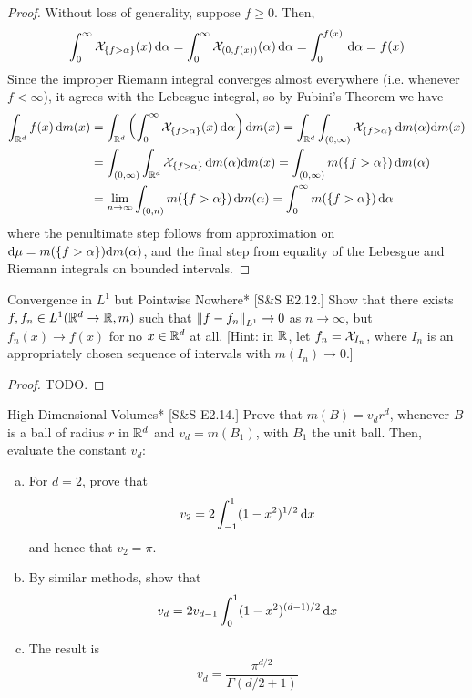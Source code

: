 \begin{proof}
    Without loss of generality, suppose \(f \geq 0\). Then, 
    \[
        \int_0^\infty \mathcal{X}_{\{f > \alpha\}}(x) \, \mathrm{d}\alpha
        = \int_0^\infty \mathcal{X}_{(0, f(x))}(\alpha) \, \mathrm{d}\alpha
        = \int_0^{f(x)} \, \mathrm{d}\alpha
        = f(x) 
    \]
    Since the improper Riemann integral converges almost everywhere (i.e. whenever \(f < \infty\)), it agrees with the Lebesgue integral, so by Fubini's Theorem we have 
    \begin{align*}
        \int_{\mathbb{R}^d} f(x) \, \mathrm{d}m(x)
        &= \int_{\mathbb{R}^d} \left(\int_0^\infty \mathcal{X}_{\{f > \alpha\}}(x) \, \mathrm{d}\alpha\right) \mathrm{d}m(x)
        = \int_{\mathbb{R}^d} \int_{(0, \infty)} \mathcal{X}_{\{f > \alpha\}} \, \mathrm{d}m(\alpha) \mathrm{d}m(x) \\
        &= \int_{(0, \infty)} \int_{\mathbb{R}^d} \mathcal{X}_{\{f > \alpha\}} \, \mathrm{d}m(\alpha) \mathrm{d}m(x)
        = \int_{(0, \infty)} m(\{f > \alpha\}) \, \mathrm{d}m(\alpha) \\
        &= \lim_{n \to \infty} \int_{(0, n)} m(\{f > \alpha\}) \, \mathrm{d}m(\alpha) 
        = \int_0^\infty m(\{f > \alpha\}) \, \mathrm{d}\alpha
    \end{align*}
    where the penultimate step follows from approximation on \(\mathrm{d}\mu = m(\{f > \alpha\}) \mathrm{d}m(\alpha)\), and the final step from equality of the Lebesgue and Riemann integrals on bounded intervals. 
\end{proof}


\begin{problem}{Convergence in \(L^1\) but Pointwise Nowhere}*
    [S\&S E2.12.] Show that there exists \(f, f_n \in L^1(\mathbb{R}^d \to \mathbb{R}, m)\) such that \(\norm{f - f_n}_{L^1} \to 0\) as \(n \to \infty\), but \(f_n(x) \to f(x)\) for no \(x \in \mathbb{R}^d\) at all. [Hint: in \(\mathbb{R}\), let \(f_n = \mathcal{X}_{I_n}\), where \(I_n\) is an appropriately chosen sequence of intervals with \(m(I_n) \to 0\).]
\end{problem}

\begin{proof}
    TODO. 
\end{proof}


\begin{problem}{High-Dimensional Volumes}*
    [S\&S E2.14.] Prove that \(m(B) = v_d r^d\), whenever \(B\) is a ball of radius \(r\) in \(\mathbb{R}^d\) and \(v_d = m(B_1)\), with \(B_1\) the unit ball. Then, evaluate the constant \(v_d\): 
    \begin{enumerate}[(a)]
        \itemsep0em
        \item For \(d = 2\), prove that 
        \[
            v_2 = 2 \int_{-1}^1 (1 - x^2)^{1/2} \, \mathrm{d}x
        \]
        and hence that \(v_2 = \pi\). 
        \item By similar methods, show that 
        \[
            v_d = 2v_{d-1} \int_0^1 (1 - x^2)^{(d-1)/2} \, \mathrm{d}x
        \]
        \item The result is 
        \[
            v_d = \frac{\pi^{d/2}}{\Gamma(d/2 + 1)}
        \]
    \end{enumerate}
\end{problem}

